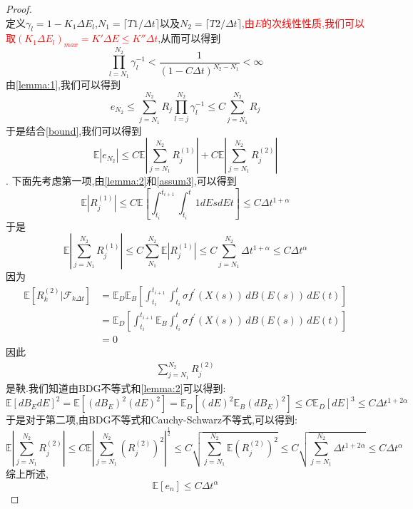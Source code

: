 \begin{proof}
\begin{equation}
	\end{equation}
	定义$\gamma_l = 1-K_1\Delta E_l$,$N_1 = \lceil T1/\Delta t \rceil$以及$N_2 = \lceil T2/\Delta t \rceil$,\textcolor{red}{由$E$的次线性性质,我们可以取$(K_1\Delta E_l)_{max} = K'\Delta E \le K'' \Delta t$},从而可以得到
	\begin{equation}\label{bound}
		\prod\limits_{l=N_1}^{N_2}\gamma_l^{-1} < \frac{1}{(1-C\Delta t)^{N_2-N_1}} < \infty
	\end{equation}
	由\cref{lemma:1},我们可以得到
	$$e_{N_2} \leq \sum\limits_{j=N_1}^{N_2}R_{j}\prod\limits_{l=j}^{N_2}\gamma_l^{-1} \le C \sum\limits_{j=N_1}^{N_2}R_{j}$$
	于是结合\cref{bound},我们可以得到
	$$\mathbb{E}  |e_{N_2}| \leq C\mathbb{E}\left|\sum\limits_{j=N_1}^{N_2}R_{j}^{(1)} \right| + C\mathbb{E}\left|\sum\limits_{j=N_1}^{N_2}R_{j}^{(2)} \right|$$.
	下面先考虑第一项,由\cref{lemma:2}和\cref{assum3},可以得到
	\begin{equation}
		\mathbb{E} |R_j^{(1)}| \le C\mathbb{E} \left[ \int_{t_i}^{t_{i+1}}\int_{t_i}^{t}1dEsdEt \right] \le C\Delta t^{1+\alpha}
	\end{equation}
	于是
	\begin{equation}
		\mathbb{E}\left|\sum\limits_{j=N_1}^{N_2}R_{j}^{(1)}\right|\leq C\sum\limits_{N_1}^{N_2}\mathbb{E}\left|R_{j}^{(1)}\right| \leq
		C\sum\limits_{j=N_1}^{N_2}\Delta t^{1+\alpha} \le C\Delta t^\alpha
	\end{equation}
	因为
	\begin{align*}
		\mathbb{E}\left[ R_{k}^{(2)}|\mathcal{F}_{k\Delta t} \right] &= \mathbb{E}_D\mathbb{E}_B\left[ \int_{t_i}^{t_{i+1}} \int_{t_i}^{t} \sigma f^{\prime}(X(s)) \, dB(E(s)) \, dE(t) \right]\\
		&=\mathbb{E}_D\left[ \int_{t_i}^{t_{i+1}} \mathbb{E}_B\int_{t_i}^{t} \sigma f^{\prime}(X(s)) \, dB(E(s)) \, dE(t) \right]\\
		&= 0
	\end{align*}
	因此
	\begin{align*}
		\sum_{j=N_1}^{N_2}R_{j}^{(2)} 
	\end{align*}
	是鞅.我们知道由BDG不等式和\cref{lemma:2}可以得到:
	\begin{equation}
		\mathbb{E}[dB_EdE]^2=\mathbb{E}[(dB_E)^2(dE)^2]=\mathbb{E}_D[(dE)^2\mathbb{E}_B(dB_E)^2]\leq
		C\mathbb{E}_{D}[dE]^3\leq C\Delta t ^{1+2\alpha}
	\end{equation}
	于是对于第二项,由BDG不等式和Cauchy-Schwarz不等式,可以得到:
	\begin{equation*}
		\mathbb{E}\left|\sum_{j=N_1}^{N_2}R_{j}^{(2)}\right|  \le C\mathbb{E} \left|\sum_{j=N_1}^{N_2}(R_{j}^{(2)})^2\right|^{\frac{1}{2}} \le C\sqrt{\sum_{j=N_1}^{N_2}\mathbb{E}(R_{j}^{(2)})^2}
		\le C\sqrt{\sum_{j=N_1}^{N_2}\Delta t^{1+2\alpha}} \le C\Delta t^{\alpha}
	\end{equation*}
	综上所述,
	\begin{equation*}
		\mathbb{E} [e_n] \leq C\Delta t^\alpha
	\end{equation*}
\end{proof}
